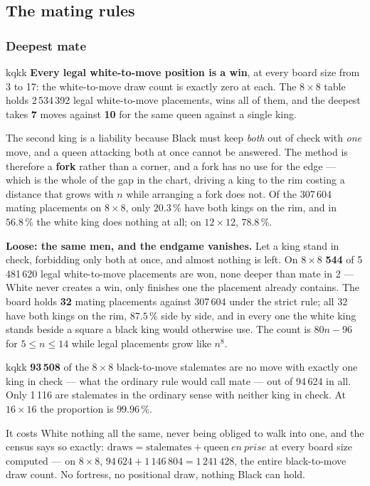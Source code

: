 \documentclass[10pt]{article}
\begin{document}
\subsection{The mating rules}\label{sub:kqkk-chess}

\subsubsection{Deepest mate}\label{sub:kqkk-strict}

\begin{result}[title={Strict: everything is won, and sooner than against one king}]{kqkk}
\textbf{Every legal white-to-move position is a win}, at every board size from
3 to 17: the white-to-move draw count is exactly zero at each. The $8\times8$
table holds 2\,534\,392 legal white-to-move placements, wins all of them, and
the deepest takes \textbf{7} moves against \textbf{10} for the same queen
against a single king.
\end{result}

\noindent
The second king is a liability because Black must keep \emph{both} out of check
with \emph{one} move, and a queen attacking both at once cannot be answered.
The method is therefore a \textbf{fork} rather than a corner, and a fork has no
use for the edge --- which is the whole of the gap in the chart, driving a king
to the rim costing a distance that grows with $n$ while arranging a fork does
not. Of the 307\,604 mating placements on $8\times8$, only $20.3\,\%$ have both
kings on the rim, and in $\mathbf{56.8\,\%}$ the white king does nothing at
all; on $12\times12$, $78.8\,\%$.

\medskip
\noindent
\textbf{Loose: the same men, and the endgame vanishes.} Let a king stand in
check, forbidding only both at once, and almost nothing is left. On $8\times8$
\textbf{544} of 5\,481\,620 legal white-to-move placements are won, none deeper
than mate in 2 --- White never creates a win, only finishes one the placement
already contains. The board holds \textbf{32} mating placements against
307\,604 under the strict rule; all 32 have both kings on the rim, $87.5\,\%$
side by side, and in every one the white king stands beside a square a black
king would otherwise use. The count is $80n-96$ for $5\le n\le14$ while legal
placements grow like $n^8$.

\begin{result}[title={What the rule costs, and there is no third kind of draw}]{kqkk}
\textbf{93\,508} of the $8\times8$ black-to-move stalemates are no move with
exactly one king in check --- what the ordinary rule would call mate --- out of
94\,624 in all. Only 1\,116 are stalemates in the ordinary sense with neither
king in check. At $16\times16$ the proportion is $99.96\,\%$.

\smallskip
It costs White nothing all the same, never being obliged to walk into one, and
the census says so exactly: $\mathrm{draws} = \mathrm{stalemates} +
\mathrm{queen}\ en\ prise$ at every board size computed --- on $8\times8$,
$94\,624 + 1\,146\,804 = 1\,241\,428$, the entire black-to-move draw count. No
fortress, no positional draw, nothing Black can hold.
\end{result}
\end{document}
